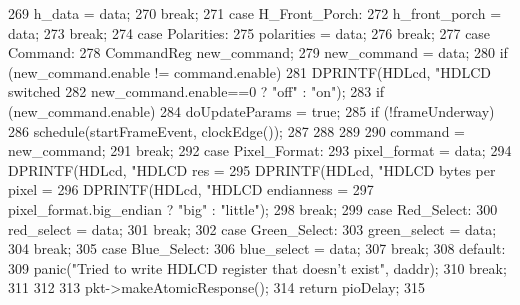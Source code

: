 \begin{DoxyCode}
{{269         h_data = data;
270         break;
271       case H_Front_Porch:
272         h_front_porch = data;
273         break;
274       case Polarities:
275         polarities = data;
276         break;
277       case Command: {
278         CommandReg new_command;
279         new_command = data;
280         if (new_command.enable != command.enable) {
281             DPRINTF(HDLcd, "HDLCD switched %
282                     new_command.enable==0 ? "off" : "on");
283             if (new_command.enable) {
284                 doUpdateParams = true;
285                 if (!frameUnderway) {
286                     schedule(startFrameEvent, clockEdge());
287                 }
288             }
289         }
290         command = new_command; }
291         break;
292       case Pixel_Format:
293         pixel_format = data;
294         DPRINTF(HDLcd, "HDLCD res = %
295         DPRINTF(HDLcd, "HDLCD bytes per pixel = %
296         DPRINTF(HDLcd, "HDLCD endianness = %
297                 pixel_format.big_endian ? "big" : "little");
298         break;
299       case Red_Select:
300         red_select = data;
301         break;
302       case Green_Select:
303         green_select = data;
304         break;
305       case Blue_Select:
306         blue_select = data;
307         break;
308       default:
309         panic("Tried to write HDLCD register that doesn't exist\n", daddr);
310         break;
311     }
312 
313     pkt->makeAtomicResponse();
314     return pioDelay;
315 }
\end{DoxyCode}


